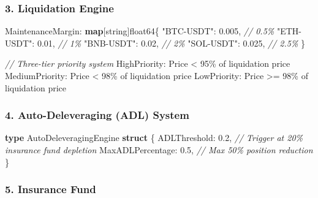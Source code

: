 \documentclass[
]{article}
\newenvironment{Shaded}{}{}
\newcommand{\CommentTok}[1]{\textcolor[rgb]{0.38,0.63,0.69}{\textit{#1}}}
\newcommand{\DataTypeTok}[1]{\textcolor[rgb]{0.56,0.13,0.00}{#1}}
\newcommand{\DecValTok}[1]{\textcolor[rgb]{0.25,0.63,0.44}{#1}}
\newcommand{\FloatTok}[1]{\textcolor[rgb]{0.25,0.63,0.44}{#1}}
\newcommand{\KeywordTok}[1]{\textcolor[rgb]{0.00,0.44,0.13}{\textbf{#1}}}
\newcommand{\NormalTok}[1]{#1}
\newcommand{\OperatorTok}[1]{\textcolor[rgb]{0.40,0.40,0.40}{#1}}
\newcommand{\StringTok}[1]{\textcolor[rgb]{0.25,0.44,0.63}{#1}}
\begin{document}
\subsubsection{3. Liquidation Engine}\label{3-liquidation-engine}

\begin{Shaded}
\begin{Highlighting}[]
\NormalTok{MaintenanceMargin}\OperatorTok{:} \KeywordTok{map}\OperatorTok{[}\DataTypeTok{string}\OperatorTok{]}\DataTypeTok{float64}\OperatorTok{\{}
    \StringTok{"BTC{-}USDT"}\OperatorTok{:}  \FloatTok{0.005}\OperatorTok{,}  \CommentTok{// 0.5\%}
    \StringTok{"ETH{-}USDT"}\OperatorTok{:}  \FloatTok{0.01}\OperatorTok{,}   \CommentTok{// 1\%}
    \StringTok{"BNB{-}USDT"}\OperatorTok{:}  \FloatTok{0.02}\OperatorTok{,}   \CommentTok{// 2\%}
    \StringTok{"SOL{-}USDT"}\OperatorTok{:}  \FloatTok{0.025}\OperatorTok{,}  \CommentTok{// 2.5\%}
\OperatorTok{\}}

\CommentTok{// Three{-}tier priority system}
\NormalTok{HighPriority}\OperatorTok{:}\NormalTok{   Price }\OperatorTok{\textless{}} \DecValTok{95}\OperatorTok{\%}\NormalTok{ of liquidation price}
\NormalTok{MediumPriority}\OperatorTok{:}\NormalTok{ Price }\OperatorTok{\textless{}} \DecValTok{98}\OperatorTok{\%}\NormalTok{ of liquidation price}
\NormalTok{LowPriority}\OperatorTok{:}\NormalTok{    Price }\OperatorTok{\textgreater{}=} \DecValTok{98}\OperatorTok{\%}\NormalTok{ of liquidation price}
\end{Highlighting}
\end{Shaded}

\subsubsection{4. Auto-Deleveraging (ADL)
System}\label{4-auto-deleveraging-adl-system}

\begin{Shaded}
\begin{Highlighting}[]
\KeywordTok{type}\NormalTok{ AutoDeleveragingEngine }\KeywordTok{struct} \OperatorTok{\{}
\NormalTok{    ADLThreshold}\OperatorTok{:}     \FloatTok{0.2}\OperatorTok{,}  \CommentTok{// Trigger at 20\% insurance fund depletion}
\NormalTok{    MaxADLPercentage}\OperatorTok{:} \FloatTok{0.5}\OperatorTok{,}  \CommentTok{// Max 50\% position reduction}
\OperatorTok{\}}
\end{Highlighting}
\end{Shaded}

\subsubsection{5. Insurance Fund}\label{5-insurance-fund}
\end{document}
